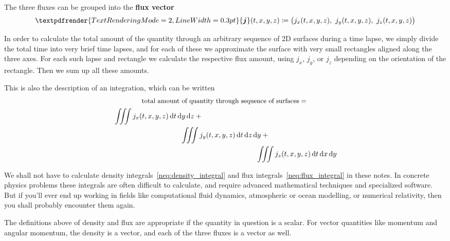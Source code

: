 \documentclass[a4paper,12pt,%
onecolumn,oneside,titlepage,%
british%
]{memoir}
\renewcommand*{\bm}[1]{\textpdfrender{TextRenderingMode=2,LineWidth=0.3pt}{\boldsymbol{#1}}}
\newcommand*{\di}{\mathrm{d}}%
\newcommand*{\defd}{\coloneqq}
\renewcommand*{\|}[1][]{\nonscript\:#1\vert\nonscript\:\mathopen{}}
\newcommand*{\yti}{t_{0}}
\newcommand*{\yN}{N}
\newcommand*{\yJ}{J}
\begin{document}
The three fluxes can be grouped into the \textbf{flux vector}
\begin{equation}
  \label{neq:flux_vector}
  \bm{j}(t,x,y,z) \defd
  \bigl(j_{x}(t,x,y,z),\ j_{y}(t,x,y,z),\ j_{z}(t,x,y,z)\bigr)
\end{equation}

In order to calculate the total amount of the quantity through an arbitrary sequence of 2D surfaces during a time lapse, we simply divide the total time into very brief time lapses, and for each of these we approximate the surface with very small rectangles aligned along the three axes. For each such lapse and rectangle we calculate the respective flux amount, using $j_{x}$, $j_{y}$, or $j_{z}$ depending on the orientation of the rectangle. Then we sum up all these amounts.
\begin{extra}
  This is also the description of an integration, which can be written
  \begin{multline}
    \label{neq:flux_integral}
    \text{\small total amount of quantity through sequence of surfaces} = {}\\
    \begin{multlined}[b][0.9\linewidth]
      \iiint j_{x}(t,x,y,z)\, \di t\, \di y\, \di z +{}
      \\\iiint j_{y}(t,x,y,z)\, \di t\, \di z\, \di y +{}
      \\\iiint j_{z}(t,x,y,z)\, \di t\, \di x\, \di y
    \end{multlined}
  \end{multline}

  We shall not have to calculate density integrals~\eqref{neq:density_integral} and flux integrals~\eqref{neq:flux_integral} in these notes. In concrete physics problems these integrals are often difficult to calculate, and require advanced mathematical techniques and specialized software. But if you'll ever end up working in fields like computational fluid dynamics, atmospheric or ocean modelling, or numerical relativity, then you shall probably encounter them again.
\end{extra}

\medskip

The definitions above of density and flux are appropriate if the quantity in question is a scalar. For vector quantities like momentum and angular momentum, the density is a vector, and each of the three fluxes is a vector as well.
\end{document}
